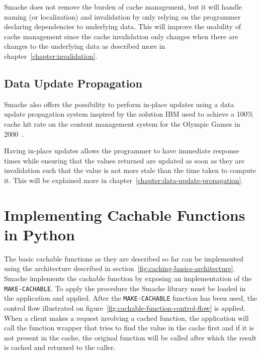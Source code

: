 Smache does not remove the burden of cache management, but it will handle naming (or localization) and invalidation by only relying on the programmer declaring dependencies to underlying data. This will improve the usability of cache management since the cache invalidation only changes when there are changes to the underlying data as described more in chapter~\ref{chapter:invalidation}.


\subsection{Data Update Propagation}
\label{subsec:model_data_update_propagation}

Smache also offers the possibility to perform in-place updates using a data update propagation system inspired by the solution IBM used to achieve a 100\% cache hit rate on the content management system for the Olympic Games in 2000~\cite{paper:ibm, paper:ibm-extended}.

Having in-place updates allows the programmer to have immediate response times while ensuring that the values returned are updated as soon as they are invalidation such that the value is not more stale than the time taken to compute it. This will be explained more in chapter~\ref{chapter:data-update-propagation}.


\section{Implementing Cachable Functions in Python}
\label{sec:implementing_cachable_functions_in_python}

The basic cachable functions as they are described so far can be implemented using the architecture described in section~\ref{fig:caching-basics-architecture}. Smache implements the cachable function by exposing an implementation of the \verb$MAKE-CACHABLE$. To apply the procedure the Smache library must be loaded in the application and applied. After the \verb$MAKE-CACHABLE$ function has been used, the control flow illustrated on figure~\ref{fig:cachable-function-control-flow} is applied. When a client makes a request involving a cached function, the application will call the function wrapper that tries to find the value in the cache first and if it is not present in the cache, the original function will be called after which the result is cached and returned to the caller.

